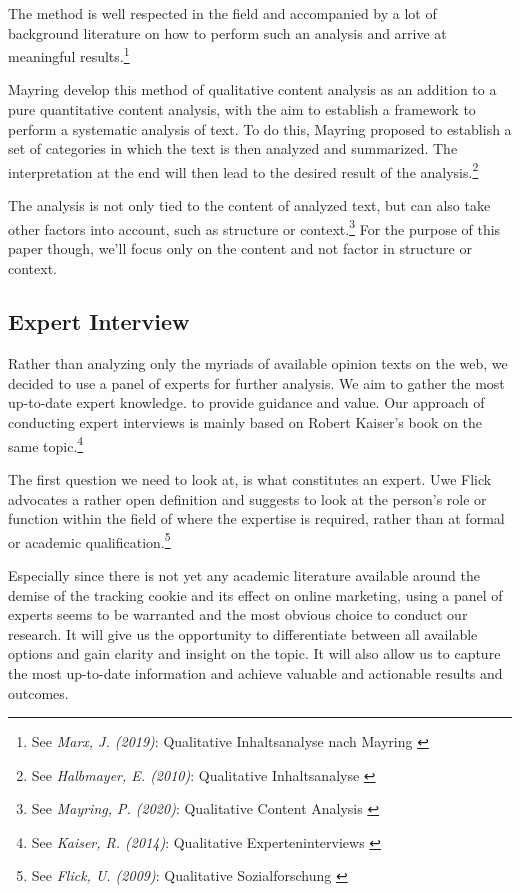The method is well respected in the field and accompanied by a lot of background literature on how to perform such an analysis and arrive at meaningful results.\footnote{See \textit{Marx, J. (2019)}: Qualitative Inhaltsanalyse nach Mayring \cite{qualiInhalt}}

Mayring develop this method of qualitative content analysis as an addition to a pure quantitative content analysis, with the aim to establish a framework to perform a systematic analysis of text. To do this, Mayring proposed to establish a set of categories in which the text is then analyzed and summarized. The interpretation at the end will then lead to the desired result of the analysis.\footnote{See \textit{Halbmayer, E. (2010)}: Qualitative Inhaltsanalyse \cite{qualiVienna}}

The analysis is not only tied to the content of analyzed text, but can also take other factors into account, such as structure or context.\footnote{See \textit{Mayring, P. (2020)}: Qualitative Content Analysis \cite{qualiContent}} For the purpose of this paper though, we'll focus only on the content and not factor in structure or context.

\subsection{Expert Interview}

Rather than analyzing only the myriads of available opinion texts on the web, we decided to use a panel of experts for further analysis. We aim to gather the most up-to-date expert knowledge. to provide guidance and value. Our approach of conducting expert interviews is mainly based on Robert Kaiser's book on the same topic.\footnote{See \textit{Kaiser, R. (2014)}: Qualitative Experteninterviews \cite{expertInterviews}}

The first question we need to look at, is what constitutes an expert. Uwe Flick advocates a rather open definition and suggests to look at the person's role or function within the field of where the expertise is required, rather than at formal or academic qualification.\footnote{See \textit{Flick, U. (2009)}: Qualitative Sozialforschung \cite{expertDefinition}}

Especially since there is not yet any academic literature available around the demise of the tracking cookie and its effect on online marketing, using a panel of experts seems to be warranted and the most obvious choice to conduct our research. It will give us the opportunity to differentiate between all available options and gain clarity and insight on the topic. It will also allow us to capture the most up-to-date information and achieve valuable and actionable results and outcomes.

